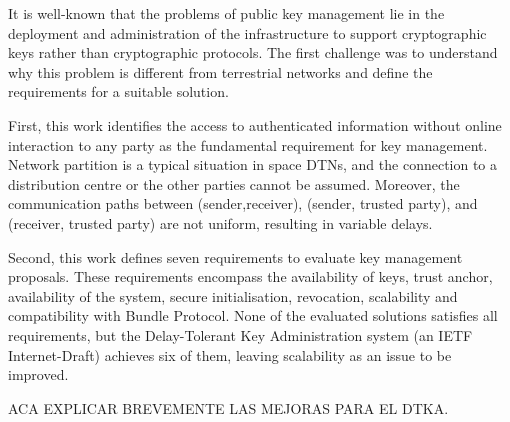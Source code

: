 It is well-known that the problems of public key management lie in the deployment and administration of the infrastructure to support cryptographic keys rather than cryptographic protocols. The first challenge was to understand why this problem is different from terrestrial networks and define the requirements for a suitable solution. 


First, this work identifies the access to authenticated information without online interaction to any party as the fundamental requirement for key management. Network partition is a typical situation in space DTNs, and the connection to a distribution centre or the other parties cannot be assumed. Moreover, the communication paths between  (sender,receiver), (sender, trusted party), and (receiver, trusted party) are not uniform, resulting in variable delays. 


Second, this work defines seven requirements to evaluate key management proposals. These requirements encompass the availability of keys, trust anchor, availability of the system, secure initialisation, revocation, scalability and compatibility with Bundle Protocol. None of the evaluated solutions satisfies all requirements, but the Delay-Tolerant Key Administration system  (an IETF Internet-Draft) achieves six of them, leaving scalability as an issue to be improved. 

ACA EXPLICAR BREVEMENTE LAS MEJORAS PARA EL DTKA. 
  


 

 








